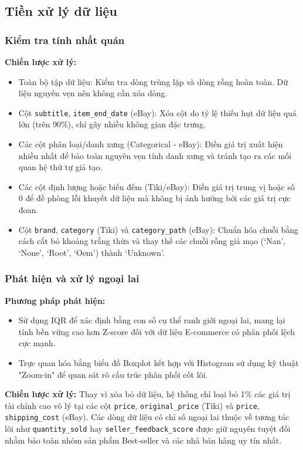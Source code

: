 \subsection{Tiền xử lý dữ liệu}

\subsubsection{Kiểm tra tính nhất quán}

\textbf{Chiến lược xử lý:}
\begin{itemize}
    \item Toàn bộ tập dữ liệu: Kiểm tra dòng trùng lặp và dòng rỗng hoàn toàn. Dữ liệu nguyên vẹn nên không cần xóa dòng.
    \item Cột \texttt{subtitle}, \texttt{item\_end\_date} (eBay): Xóa cột do tỷ lệ thiếu hụt dữ liệu quá lớn (trên 90\%), chỉ gây nhiễu không gian đặc trưng.
    \item Các cột phân loại/danh xưng (Categorical - eBay): Điền giá trị xuất hiện nhiều nhất để bảo toàn nguyên vẹn tính danh xưng và tránh tạo ra các mối quan hệ thứ tự giả tạo.
    \item Các cột định lượng hoặc biến đếm (Tiki/eBay): Điền giá trị trung vị hoặc số 0 để đề phòng lỗi khuyết dữ liệu mà không bị ảnh hưởng bởi các giá trị cực đoan.
    \item Cột \texttt{brand}, \texttt{category} (Tiki) và \texttt{category\_path} (eBay): Chuẩn hóa chuỗi bằng cách cắt bỏ khoảng trắng thừa và thay thế các chuỗi rỗng giả mạo (`Nan', `None', `Root', `Oem') thành `Unknown'.
\end{itemize}

\subsubsection{Phát hiện và xử lý ngoại lai}

\textbf{Phương pháp phát hiện:}
\begin{itemize}
    \item Sử dụng IQR để xác định bằng con số cụ thể ranh giới ngoại lai, mang lại tính bền vững cao hơn Z-score đối với dữ liệu E-commerce có phân phối lệch cực mạnh.
    \item Trực quan hóa bằng biểu đồ Boxplot kết hợp với Histogram sử dụng kỹ thuật "Zoom-in" để quan sát rõ cấu trúc phân phối cốt lõi.
\end{itemize}

\textbf{Chiến lược xử lý:} 
 Thay vì xóa bỏ dữ liệu, hệ thống chỉ loại bỏ 1\% các giá trị tài chính cao vô lý tại các cột \texttt{price}, \texttt{original\_price} (Tiki) và \texttt{price}, \texttt{shipping\_cost} (eBay). Các dòng dữ liệu có chỉ số ngoại lai thuộc về tương tác lõi như \texttt{quantity\_sold} hay  \texttt{seller\_feedback\_score} được giữ nguyên tuyệt đối nhằm bảo toàn nhóm sản phẩm Best-seller và các nhà bán hàng uy tín nhất.


